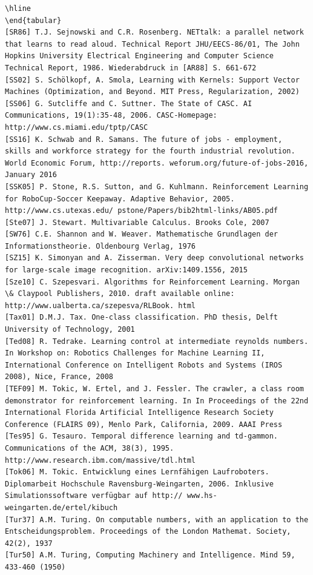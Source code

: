 \documentclass[10pt]{book}
\begin{document}
\begin{center}
\begin{enumerate}
\begin{center}
\begin{center}
\begin{center}
\begin{center}
\begin{center}
\begin{verbatim}
\hline
\end{tabular}
[SR86] T.J. Sejnowski and C.R. Rosenberg. NETtalk: a parallel network that learns to read aloud. Technical Report JHU/EECS-86/01, The John Hopkins University Electrical Engineering and Computer Science Technical Report, 1986. Wiederabdruck in [AR88] S. 661-672
[SS02] S. Schölkopf, A. Smola, Learning with Kernels: Support Vector Machines (Optimization, and Beyond. MIT Press, Regularization, 2002)
[SS06] G. Sutcliffe and C. Suttner. The State of CASC. AI Communications, 19(1):35-48, 2006. CASC-Homepage: http://www.cs.miami.edu/tptp/CASC
[SS16] K. Schwab and R. Samans. The future of jobs - employment, skills and workforce strategy for the fourth industrial revolution. World Economic Forum, http://reports. weforum.org/future-of-jobs-2016, January 2016
[SSK05] P. Stone, R.S. Sutton, and G. Kuhlmann. Reinforcement Learning for RoboCup-Soccer Keepaway. Adaptive Behavior, 2005. http://www.cs.utexas.edu/ pstone/Papers/bib2html-links/AB05.pdf
[Ste07] J. Stewart. Multivariable Calculus. Brooks Cole, 2007
[SW76] C.E. Shannon and W. Weaver. Mathematische Grundlagen der Informationstheorie. Oldenbourg Verlag, 1976
[SZ15] K. Simonyan and A. Zisserman. Very deep convolutional networks for large-scale image recognition. arXiv:1409.1556, 2015
[Sze10] C. Szepesvari. Algorithms for Reinforcement Learning. Morgan \& Claypool Publishers, 2010. draft available online: http://www.ualberta.ca/szepesva/RLBook. html
[Tax01] D.M.J. Tax. One-class classification. PhD thesis, Delft University of Technology, 2001
[Ted08] R. Tedrake. Learning control at intermediate reynolds numbers. In Workshop on: Robotics Challenges for Machine Learning II, International Conference on Intelligent Robots and Systems (IROS 2008), Nice, France, 2008
[TEF09] M. Tokic, W. Ertel, and J. Fessler. The crawler, a class room demonstrator for reinforcement learning. In In Proceedings of the 22nd International Florida Artificial Intelligence Research Society Conference (FLAIRS 09), Menlo Park, California, 2009. AAAI Press
[Tes95] G. Tesauro. Temporal difference learning and td-gammon. Communications of the ACM, 38(3), 1995. http://www.research.ibm.com/massive/tdl.html
[Tok06] M. Tokic. Entwicklung eines Lernfähigen Laufroboters. Diplomarbeit Hochschule Ravensburg-Weingarten, 2006. Inklusive Simulationssoftware verfügbar auf http:// www.hs-weingarten.de/ertel/kibuch
[Tur37] A.M. Turing. On computable numbers, with an application to the Entscheidungsproblem. Proceedings of the London Mathemat. Society, 42(2), 1937
[Tur50] A.M. Turing, Computing Machinery and Intelligence. Mind 59, 433-460 (1950)

\end{verbatim}
\end{center}
\end{center}
\end{center}
\end{center}
\end{center}
\end{enumerate}
\end{center}
\end{document}

